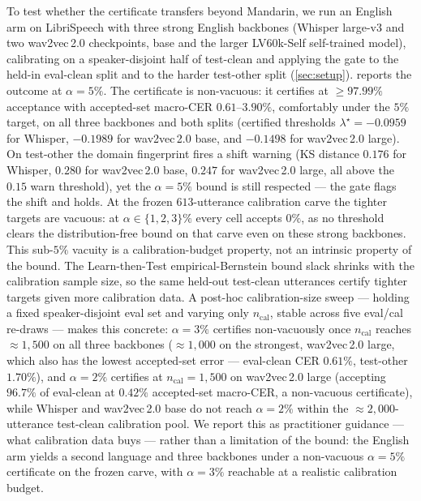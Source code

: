 \documentclass[11pt]{article}
\begin{document}
To test whether the certificate transfers beyond Mandarin, we run an English arm on
LibriSpeech with three strong English backbones (Whisper large-v3 and two wav2vec\,2.0
checkpoints, base and the larger LV60k-Self self-trained model),
calibrating on a speaker-disjoint half of test-clean and applying the gate to the held-in
eval-clean split and to the harder test-other split (\cref{sec:setup}). 
reports the outcome at $\alpha=5\%$. The certificate is non-vacuous: it certifies
at $\ge97.99\%$ acceptance with accepted-set macro-CER $0.61$--$3.90\%$, comfortably under
the $5\%$ target, on all three backbones and both splits (certified thresholds
$\lambda^\star=-0.0959$ for Whisper, $-0.1989$ for wav2vec\,2.0 base, and $-0.1498$ for
wav2vec\,2.0 large). On test-other the
domain fingerprint fires a shift warning (KS distance $0.176$ for Whisper, $0.280$ for
wav2vec\,2.0 base, $0.247$ for wav2vec\,2.0 large, all above the $0.15$ warn threshold),
yet the $\alpha=5\%$ bound is still
respected --- the gate flags the shift and holds. At the frozen $613$-utterance
calibration carve the tighter targets are vacuous: at $\alpha\in\{1,2,3\}\%$ every cell
accepts $0\%$, as no threshold clears the distribution-free bound on that carve even on
these strong backbones. This sub-$5\%$ vacuity is a calibration-budget
property, not an intrinsic property of the bound. The Learn-then-Test empirical-Bernstein
bound slack shrinks with the calibration sample size, so the same held-out test-clean
utterances certify tighter targets given more calibration data. A post-hoc calibration-size
sweep --- holding a fixed speaker-disjoint eval set and varying only $n_{\mathrm{cal}}$,
stable across five eval/cal re-draws --- makes this concrete: $\alpha=3\%$ certifies
non-vacuously once $n_{\mathrm{cal}}$ reaches $\approx1{,}500$ on all three backbones
($\approx1{,}000$ on the strongest, wav2vec\,2.0 large, which also has the lowest
accepted-set error --- eval-clean CER $0.61\%$, test-other $1.70\%$), and $\alpha=2\%$
certifies at $n_{\mathrm{cal}}=1{,}500$ on wav2vec\,2.0 large (accepting $96.7\%$ of
eval-clean at $0.42\%$ accepted-set macro-CER, a non-vacuous certificate), while
Whisper and wav2vec\,2.0 base do not reach $\alpha=2\%$ within the $\approx2{,}000$-utterance
test-clean calibration pool. We report this as practitioner guidance --- what calibration
data buys --- rather than a limitation of the bound: the English arm yields a second language
and three backbones under a non-vacuous $\alpha=5\%$ certificate on the frozen carve, with
$\alpha=3\%$ reachable at a realistic calibration budget.
\end{document}
